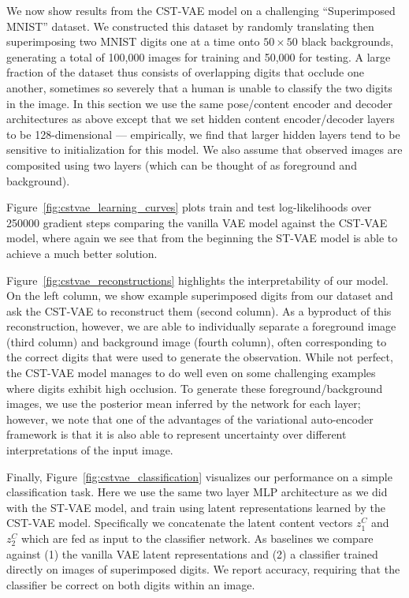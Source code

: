 We now show results from the CST-VAE model on a challenging ``Superimposed MNIST'' dataset.
We constructed this dataset
by randomly translating then superimposing two MNIST digits one at a time onto $50\times 50$ black backgrounds,
generating a total of 100,000 images for training and 50,000 for testing.  
A large fraction of the dataset thus consists of overlapping digits that occlude one another, sometimes so severely that
a human is unable to classify the two digits in the image.
In this section we use the same pose/content encoder and decoder
architectures as above except that we set hidden content encoder/decoder layers to be 128-dimensional --- empirically,
we find that larger hidden layers tend to be sensitive to initialization for this model.
We also assume that observed images are composited
using two layers (which can be thought of as foreground and background).

Figure~\ref{fig:cstvae_learning_curves}
plots train and test log-likelihoods over 250000 gradient steps
comparing the vanilla VAE model against the CST-VAE model, where again
we see that from the beginning the ST-VAE
model is able to achieve a much better solution. 

Figure~\ref{fig:cstvae_reconstructions} highlights the interpretability of our model.
On the left column, we show example superimposed digits from our dataset and ask the 
CST-VAE to reconstruct them (second column).  As a byproduct of this reconstruction, however,
we are able to individually separate a foreground image (third column) and background image (fourth column),
often corresponding to the correct digits that were used to generate the observation.  
 While not perfect, the CST-VAE model manages to do well even on some challenging examples where
 digits exhibit high occlusion.  To generate these foreground/background images, we use the posterior mean
 inferred by the network for each layer; however, we note that one of the advantages of the 
 variational auto-encoder framework is that it is also able to represent uncertainty over different interpretations
 of the input image.

Finally, Figure~\ref{fig:cstvae_classification} visualizes our performance on a simple classification task.
Here we use the same two layer MLP architecture as we did with the ST-VAE model, and train using latent representations
learned by the CST-VAE model.  Specifically we concatenate the latent content vectors $z^C_1$ and $z^C_2$
which are fed as input to the classifier network.  As baselines we compare against (1) the vanilla VAE latent representations 
and (2) a classifier trained directly on images of superimposed digits.  We report accuracy, requiring that the classifier
be correct on both digits within an image.


